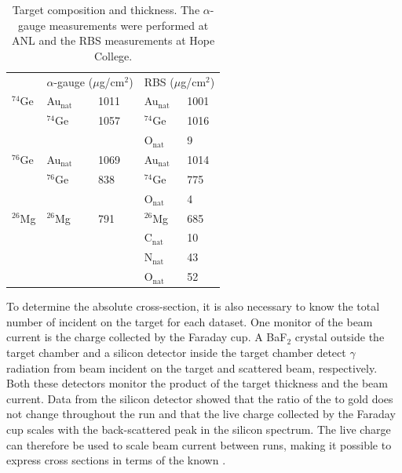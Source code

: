 \begin{table}[htp]
\centering
\begin{tabular}{lllll}
 & \multicolumn{2}{c}{$\alpha$-gauge ($\mu$g/cm$^2$)} & \multicolumn{2}{c}{RBS ($\mu$g/cm$^2$)} \\
\cline{2-3}\cline{4-5}
$^{74}$Ge & Au$_{\text{nat}}$ & 1011 & Au$_{\text{nat}}$ & 1001 \\
          & $^{74}$Ge & 1057 & $^{74}$Ge & 1016 \\
          &           &      & O$_{\text{nat}}$ & 9 \\[0.35cm]

$^{76}$Ge & Au$_{\text{nat}}$ & 1069 & Au$_{\text{nat}}$ & 1014 \\
          & $^{76}$Ge & 838 & $^{74}$Ge & 775 \\
          &           &      & O$_{\text{nat}}$ & 4 \\[0.35cm]

$^{26}$Mg & $^{26}$Mg & 791 & $^{26}$Mg & 685 \\
          &           &      & C$_{\text{nat}}$ & 10 \\
          &           &      & N$_{\text{nat}}$ & 43 \\
          &           &      & O$_{\text{nat}}$ & 52 \\
\end{tabular}
\caption{Target composition and thickness.  The $\alpha$-gauge measurements were performed at ANL and the RBS measurements at Hope College.}
\label{tab:targets}
\end{table}

To determine the absolute cross-section, it is also necessary to know the total number of  incident on the target for each dataset.  One monitor of the beam current is the charge collected by the Faraday cup.  A BaF$_2$ crystal outside the target chamber and a silicon detector inside the target chamber detect $\gamma$ radiation from beam incident on the target and scattered  beam, respectively.  Both these detectors monitor the product of the target thickness and the beam current.  Data from the silicon detector showed that the ratio of the \GeTargets to gold does not change throughout the run and that the live charge collected by the Faraday cup scales with the back-scattered peak in the silicon spectrum.  The live charge can therefore be used to scale beam current between runs, making it possible to express \reaction cross sections in terms of the known \MgReaction.

